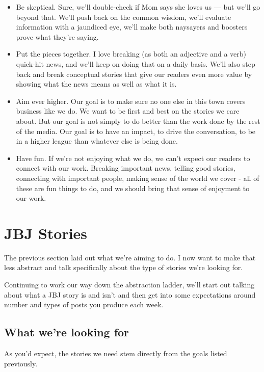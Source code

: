 \documentclass[
  12pt,
  american,
  letterpaperpaper,
  extrafontsizes,onecolumn,openright
  ]{memoir}
\begin{document}
\begin{itemize}
\item
  Be skeptical. Sure, we'll double-check if Mom says she loves us --- but we'll go beyond that. We'll push back on the common wisdom, we'll evaluate information with a jaundiced eye, we'll make both naysayers and boosters prove what they're saying.
\item
  Put the pieces together. I love breaking (as both an adjective and a verb) quick-hit news, and we'll keep on doing that on a daily basis. We'll also step back and break conceptual stories that give our readers even more value by showing what the news means as well as what it is.
\item
  Aim ever higher. Our goal is to make sure no one else in this town covers business like we do. We want to be first and best on the stories we care about. But our goal is not simply to do better than the work done by the rest of the media. Our goal is to have an impact, to drive the conversation, to be in a higher league than whatever else is being done.
\item
  Have fun. If we're not enjoying what we do, we can't expect our readers to connect with our work. Breaking important news, telling good stories, connecting with important people, making sense of the world we cover - all of these are fun things to do, and we should bring that sense of enjoyment to our work.
\end{itemize}

\hypertarget{jbj-stories}{%
\chapter{JBJ Stories}\label{jbj-stories}}

The previous section laid out what we're aiming to do. I now want to make that less abstract and talk specifically about the type of stories we're looking for.

Continuing to work our way down the abstraction ladder, we'll start out talking about what a JBJ story is and isn't and then get into some expectations around number and types of posts you produce each week.

\hypertarget{what-were-looking-for}{%
\section*{What we're looking for}\label{what-were-looking-for}}

As you'd expect, the stories we need stem directly from the goals listed previously.
\end{document}
